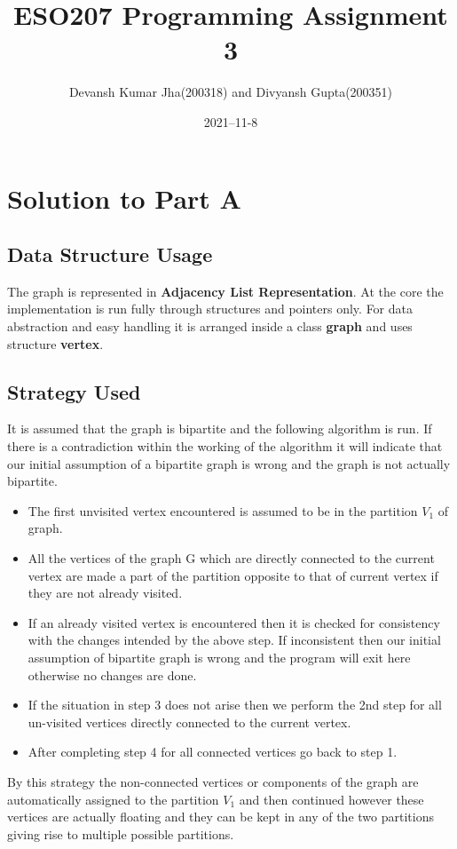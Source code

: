 \documentclass[20pt]{article}
\title{ESO207 Programming Assignment 3}
\author{Devansh Kumar Jha(200318) and Divyansh Gupta(200351)}
\date{2021–11-8}
\begin{document}
\maketitle

\section{Solution to Part A}
\subsection{Data Structure Usage}
The graph is represented in \textbf{Adjacency List Representation}. At the core the implementation is run fully through structures and pointers only. For data abstraction and easy handling it is arranged inside a class \textbf{graph} and uses structure \textbf{vertex}.

\subsection{Strategy Used}
It is assumed that the graph is bipartite and the following algorithm is run. If there is a contradiction within the working of the algorithm it will indicate that our initial assumption of a bipartite graph is wrong and the graph is not actually bipartite.

\begin{itemize}
\item The first unvisited vertex encountered is assumed to be in the partition $V_1$ of graph.
\item All the vertices of the graph G which are directly connected to the current vertex are made a part of the partition opposite to that of current vertex if they are not already visited.
\item If an already visited vertex is encountered then it is checked for consistency with the changes intended by the above step. If inconsistent then our initial assumption of bipartite graph is wrong and the program will exit here otherwise no changes are done.
\item If the situation in step 3 does not arise then we perform the 2nd step for all un-visited vertices directly connected to the current vertex.
\item After completing step 4 for all connected vertices go back to step 1.
\end{itemize}

By this strategy the non-connected vertices or components of the graph are automatically assigned to the partition $V_1$ and then continued however these vertices are actually floating and they can be kept in any of the two partitions giving rise to multiple possible partitions.
\end{document}
